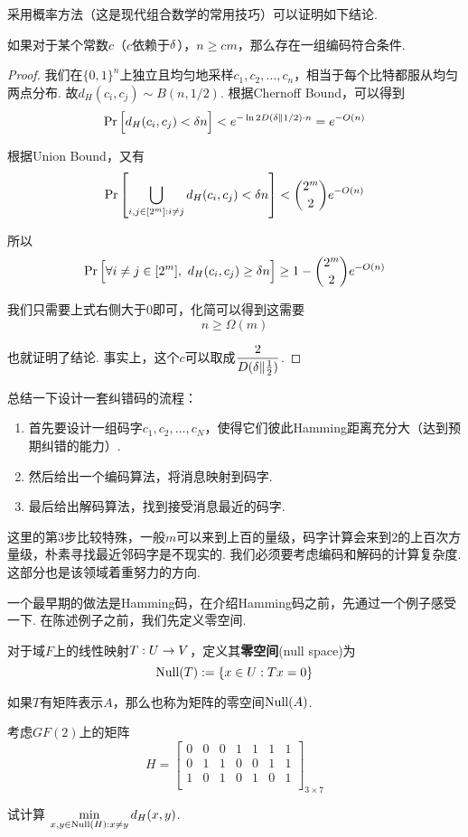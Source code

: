 采用概率方法（这是现代组合数学的常用技巧）可以证明如下结论. 
\begin{theorem}
    如果对于某个常数$c$（$c$依赖于$\delta$），$n \ge cm$，那么存在一组编码符合条件.
\end{theorem}
\begin{proof}
    我们在$\{0,1\}^n$上独立且均匀地采样$c_1, c_2, \dots, c_n$，相当于每个比特都服从均匀两点分布. 故$d_H(c_i,c_j) \sim B(n, 1/2)$.  根据Chernoff Bound，可以得到 
\[
\Pr \Big[
d_H(c_i, c_j) < \delta n  
\Big] < e^{- \ln 2  D(\delta \| 1/2) \cdot n} = e^{-O(n)}
\]

根据Union Bound，又有 
\[
\Pr \left[
    \bigcup_{i,j \in [2^m]: i\neq j} d_H(c_i, c_j) < \delta n
\right] < \binom{2^m}{2}e^{-O(n)}
\]

所以 
\[
\Pr \Big[
    \forall i\neq j \in [2^m],\ d_H(c_i,c_j) \ge \delta n
\Big] \ge 1 - \binom{2^m}{2}e^{-O(n)}
\]

我们只需要上式右侧大于0即可，化简可以得到这需要 
\[
n \ge \Omega(m)
\]

也就证明了结论. 事实上，这个$c$可以取成$\dfrac{2}{D(\delta \| \frac 12)}$. 
\end{proof}

总结一下设计一套纠错码的流程：
\begin{enumerate}
    \item 首先要设计一组码字$c_1,c_2,\dots, c_N$，使得它们彼此Hamming距离充分大（达到预期纠错的能力）. 
    \item 然后给出一个编码算法，将消息映射到码字. 
    \item 最后给出解码算法，找到接受消息最近的码字. 
\end{enumerate}

这里的第3步比较特殊，一般$m$可以来到上百的量级，码字计算会来到2的上百次方量级，朴素寻找最近邻码字是不现实的. 我们必须要考虑编码和解码的计算复杂度.  这部分也是该领域着重努力的方向.  

一个最早期的做法是Hamming码，在介绍Hamming码之前，先通过一个例子感受一下. 在陈述例子之前，我们先定义零空间. 
\begin{definition}
    对于域$F$上的线性映射$T: U \rightarrow V$，定义其\textbf{零空间}(null space)为
    \[
    \operatorname*{Null} (T):= \{x\in U: Tx = 0\}
    \]

    如果$T$有矩阵表示$A$，那么也称为矩阵的零空间$\operatorname*{Null} (A)$. 
\end{definition}
\begin{example}
    考虑$GF(2)$上的矩阵 
    \[
    H = \begin{bmatrix}
        0 & 0 & 0 & 1 & 1 & 1 & 1 \\ 
        0 & 1 & 1 & 0 & 0 & 1 & 1 \\ 
        1 & 0 & 1 & 0 & 1 & 0 & 1 \\ 
    \end{bmatrix}_{3 \times 7}
    \]

    试计算 $\min\limits_{x,y \in \operatorname*{Null}(H): x\neq y} d_H(x,y)$.
\end{example}

